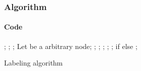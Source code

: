 \begin{frame}
  \frametitle{Algorithm}
  \framesubtitle{Code}
  \begin{algorithm}[H]
    \scriptsize
    \begin{algorithmic}[1]
      \REQUIRE {}
      \STATE {};
      \STATE {};
      \STATE {};
      \label{step:main_while}
        \STATE Let  be a  arbitrary node;
        \label{step:explore_arcs}
          \STATE {};
              \STATE {};
            \ENDIF
          \ENDFOR
          \STATE {};
            \STATE {};
          \ENDIF
        \ENDFOR
        \STATE {};
      \ENDWHILE
      \RETURN {} if  else \blue{$\infty$};
    \end{algorithmic}
    \caption{Labeling algorithm}
    \label{alg:seq}
  \end{algorithm}
\end{frame}

